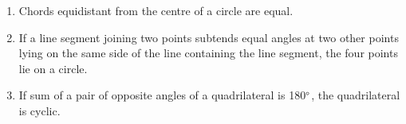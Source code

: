 \begin{enumerate}[label=\thesubsection.\arabic*,ref=\thesubsection.\theenumi]
\item Chords equidistant from the centre  of a circle  are equal.
\item  If a line segment joining two points subtends equal angles at two other points lying on the same side of the line containing the line segment, the four points lie on a circle. 

\item  If sum of a pair of opposite angles of a quadrilateral is 180$\degree$, the quadrilateral is cyclic.
\end{enumerate}
